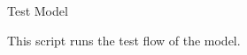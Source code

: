 \begin{section}{Test Model}
    \par This script runs the test flow of the model.
    
\end{section}
\clearpage